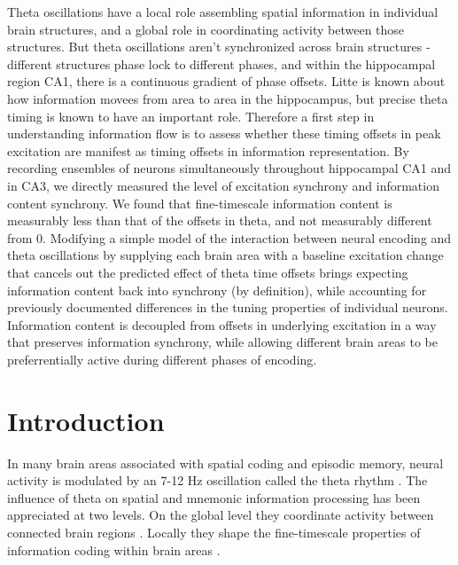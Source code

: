 \documentclass[10pt]{article}
\begin{document}
Theta oscillations have a local role assembling spatial information in individual brain structures, and a global role in coordinating activity between those structures.  But theta oscillations aren't synchronized across brain structures - different structures phase lock to different phases, and within the hippocampal region CA1, there is a continuous gradient of phase offsets.  Litte is known about how information movees from area to area in the hippocampus, but precise theta timing is known to have an important role.  Therefore a first step in understanding information flow is to assess whether these timing offsets in peak excitation are manifest as timing offsets in information representation.  By recording ensembles of neurons simultaneously throughout hippocampal CA1 and in CA3, we directly measured the level of excitation synchrony and information content synchrony.  We found that fine-timescale information content is measurably less than that of the offsets in theta, and not measurably different from 0.  Modifying a simple model of the interaction between neural encoding and theta oscillations by supplying each brain area with a baseline excitation change that cancels out the predicted effect of theta time offsets brings expecting information content back into synchrony (by definition), while accounting for previously documented differences in the tuning properties of individual neurons.  Information content is decoupled from offsets in underlying excitation in a way that preserves information synchrony, while allowing different brain areas to be preferrentially active during different phases of encoding.

\section*{Introduction}
In many brain areas associated with spatial coding and episodic memory, neural activity is modulated by an 7-12 Hz oscillation called the theta rhythm \cite{vanderwolf1969hippocampal, buzsaki2002theta}.  The influence of theta on spatial and mnemonic information processing has been appreciated at two levels. On the global level they coordinate activity between connected brain regions \cite{Siapas2006, Jones2006, Serota2010, Colgin2011}. Locally they shape the fine-timescale properties of information coding within brain areas \cite{Recce1993,Skaggs1996,Mehta2002,Dragoi2006, Leutgeb2010}.
\end{document}
